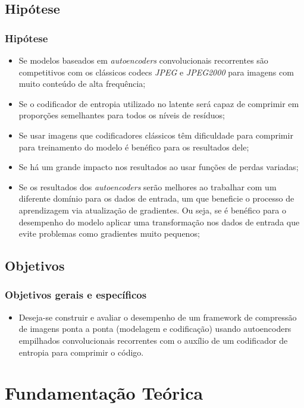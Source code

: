 \documentclass{beamer}
\begin{document}
\subsection{Hipótese}
\begin{frame}
\frametitle{Hipótese}
\begin{itemize}
\item Se modelos baseados em \textit{autoencoders} convolucionais recorrentes são competitivos com os clássicos codecs \textit{JPEG} e \textit{JPEG2000} para imagens com muito conteúdo de alta frequência;
\item Se o codificador de entropia utilizado no latente será capaz de comprimir em proporções semelhantes para todos os níveis de resíduos;
\item Se usar imagens que codificadores clássicos têm dificuldade para comprimir para treinamento do modelo é benéfico para os resultados dele;
\item Se há um grande impacto nos resultados ao usar funções de perdas variadas;
\item Se os resultados dos \textit{autoencoders} serão melhores ao trabalhar com um diferente domínio para os dados de entrada, um que beneficie o processo de aprendizagem via atualização de gradientes. Ou seja, se é benéfico para o desempenho do modelo aplicar uma transformação nos dados de entrada que evite problemas como gradientes muito pequenos;
\end{itemize}
\end{frame}
\subsection{Objetivos}
\begin{frame}
\frametitle{Objetivos gerais e específicos}
\begin{itemize}
\item Deseja-se construir e avaliar o desempenho de um framework de compressão de imagens
ponta a ponta (modelagem e codificação) usando autoencoders empilhados convolucionais
recorrentes com o auxílio de um codificador de entropia para comprimir o código.
\end{itemize}
\end{frame}
\section{Fundamentação Teórica}
\end{document}
